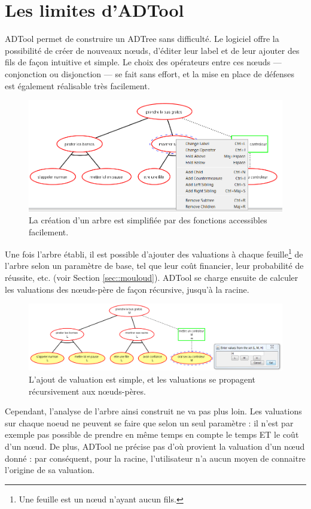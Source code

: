 \section{Les limites d'ADTool}
	\label{sec:adtool}

	ADTool permet de construire un ADTree sans difficulté. Le logiciel offre la possibilité de créer de nouveaux nœuds, d'éditer leur label et de leur ajouter des fils de façon intuitive et simple. Le choix des opérateurs entre ces nœuds --- conjonction ou disjonction ---  se fait sans effort, et la mise en place de défenses est également réalisable très facilement. 
	
	\begin{figure}[h]
            \centering
            \includegraphics[width=1\textwidth]{figure/not_real_adtool_add_child.png}
            \caption{La création d'un arbre est simplifiée par des fonctions accessibles facilement.}
            \label{fig:arbre_exemple_1}
    \end{figure}
	
	
	Une fois l'arbre établi, il est possible d'ajouter des valuations à chaque feuille\footnote{Une feuille est un nœud n'ayant aucun fils.} de l'arbre selon un paramètre de base, tel que leur coût financier, leur probabilité de réussite, etc. (voir Section \ref{sec::mouloud}). ADTool se charge ensuite de calculer les valuations des nœuds-père de façon récursive, jusqu'à la racine.
	
	\begin{figure}[h]
            \centering
            \includegraphics[width=1\textwidth]{figure/not_real_adtool_add_values.png}
            \caption{L'ajout de valuation est simple, et les valuations se propagent récursivement aux nœuds-pères.}
            \label{fig:arbre_exemple_1}
    \end{figure}
	
	Cependant, l'analyse de l'arbre ainsi construit ne va pas plus loin. Les valuations sur chaque noeud ne peuvent se faire que selon un seul paramètre : il n'est par exemple pas possible de prendre en même temps en compte le temps ET le coût d'un nœud. De plus, ADTool ne précise pas d'où provient la valuation d'un nœud donné : par conséquent, pour la racine, l'utilisateur n'a aucun moyen de connaitre l'origine de sa valuation.
